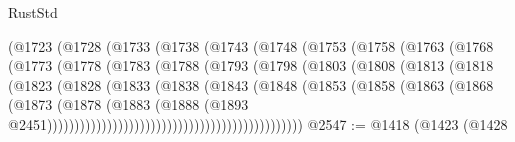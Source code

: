 \begin{lexlean}{RustStd}
\begin{coremodule}
                            (@1723
                              (@1728
                                (@1733
                                  (@1738
                                    (@1743
                                      (@1748
                                        (@1753
                                          (@1758
                                            (@1763
                                              (@1768
                                                (@1773
                                                  (@1778
                                                    (@1783
                                                      (@1788
                                                        (@1793
                                                          (@1798
                                                            (@1803
                                                              (@1808
                                                                (@1813
                                                                  (@1818
                                                                    (@1823
                                                                      (@1828
                                                                        (@1833
                                                                          (@1838
                                                                            (@1843
                                                                              (@1848
                                                                                (@1853
                                                                                  (@1858
                                                                                    (@1863
                                                                                      (@1868
                                                                                        (@1873
                                                                                          (@1878
                                                                                            (@1883
                                                                                              (@1888
                                                                                                (@1893
                                                                                                  @2451)))))))))))))))))))))))))))))))))))))))))))))))
@2547 := @1418
    (@1423
      (@1428

\end{coremodule}
\end{lexlean}
